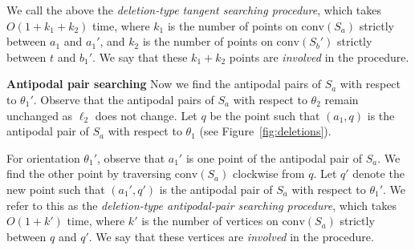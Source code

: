 \documentclass[english,a4paper, cleveref, autoref, thm-restate, nolineno]{socg-lipics-v2021}
\theoremstyle{star}
\theoremstyle{claimstar}
\newcommand{\conv}{\ensuremath{\mathrm{conv}}}
\begin{document}



We call the above the \emph{deletion-type tangent searching procedure}, which takes $O(1+k_1+k_2)$ time, where $k_1$ is the number of points on $\conv(S_a)$ strictly between $a_1$ and $a_1'$, and $k_2$ is the number of points on $\conv(S_b')$ strictly between $t$ and $b_1'$. 
We say that these $k_1 + k_2$ points are \emph{involved} in the procedure.


    



\textbf{Antipodal pair searching}
Now we find the antipodal pairs of $S_a$ with respect to $\theta_1'$. Observe that the antipodal pairs of $S_a$ with respect to $\theta_2$  remain unchanged as $\ell_2$ does not change.
Let $q$ be the point such that $(a_1, q)$ is the antipodal pair of $S_a$ with respect to $\theta_1$ (see Figure~\ref{fig:deletions}).


For orientation $\theta_1'$, observe that $a_1'$ is one point of the antipodal pair of $S_a$. 
We find the other point by traversing $\conv(S_a)$ clockwise from $q$. 
Let $q'$ denote the new point such that $(a_1', q')$ is the antipodal pair of $S_a$ with respect to $\theta_1'$. 
We refer to this as the \emph{deletion-type antipodal-pair searching procedure}, which takes $O(1 + k')$ time, where $k'$ is the number of vertices on $\conv(S_a)$ strictly between $q$ and $q'$.
We say that these vertices are \emph{involved} in the procedure.
\end{document}
